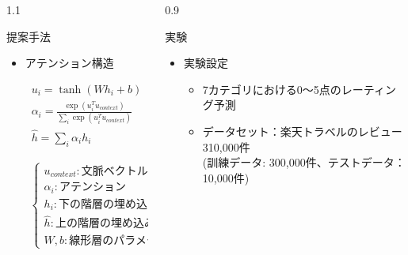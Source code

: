 \documentclass[unicode,10pt]{beamer}
\newlength{\mycolumnwidth}
\newcommand{\itemtitle}[1]{#1\\}
\begin{document}
\begin{frame}[t]
\begin{columns}[onlytextwidth,t]
\begin{column}{1.1\mycolumnwidth}
\begin{block}{提案手法}
\begin{figure}
      \end{figure}
      \vspace{-5ex} %
      \begin{itemize}
        \item アテンション構造 \cite{yang16}
          \hspace{-8em} %
          \begin{minipage}[t]{0.4\linewidth}
            \begin{gather*}
              u_i = \tanh (W h_{i} + b) \\
              \alpha_i = \frac{\exp (u^T_i u_{context})}
                              {\sum_i \exp (u^T_i u_{context})} \\
              \hat{h} = \sum_i \alpha_i h_i
            \end{gather*}
          \end{minipage}
          \begin{minipage}[t]{0.1\linewidth}
            \begin{gather*}
              \begin{cases}
                u_{context} : \text{文脈ベクトル} \\
                \alpha_i : \text{アテンション} \\
                h_i : \text{下の階層の埋め込み} \\
                \hat{h} : \text{上の階層の埋め込み} \\
                W, b : \text{線形層のパラメータ}
              \end{cases}
            \end{gather*}
          \end{minipage}
      \end{itemize}
    \end{block}
  \end{column}

  \begin{column}{0.9\mycolumnwidth}
    \begin{block}{実験}
      \begin{itemize}
        \item \itemtitle{実験設定}
          \begin{itemize}
            \item 7カテゴリにおける0〜5点のレーティング予測
            \item データセット：楽天トラベルのレビュー310,000件 \\
                  (訓練データ: 300,000件、テストデータ： 10,000件)
          \end{itemize}
      \end{itemize}


\end{block}
\end{column}
\end{columns}
\end{frame}
\end{document}
